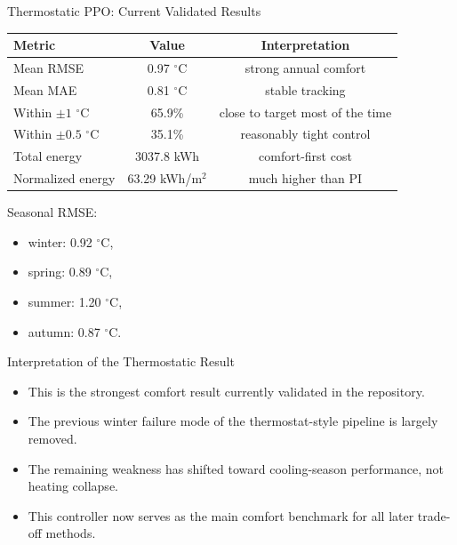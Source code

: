 \documentclass[aspectratio=169,11pt]{beamer}
\newcommand{\degc}{\ensuremath{^\circ\mathrm{C}}}
\begin{document}
\begin{frame}{Thermostatic PPO: Current Validated Results}
  \small
  \begin{tabular}{lcc}
    \toprule
    Metric & Value & Interpretation \\
    \midrule
    Mean RMSE & 0.97 \degc{} & strong annual comfort \\
    Mean MAE & 0.81 \degc{} & stable tracking \\
    Within $\pm 1$ \degc{} & 65.9\% & close to target most of the time \\
    Within $\pm 0.5$ \degc{} & 35.1\% & reasonably tight control \\
    Total energy & 3037.8 kWh & comfort-first cost \\
    Normalized energy & 63.29 kWh/m$^2$ & much higher than PI \\
    \bottomrule
  \end{tabular}

  \vspace{0.75em}
  Seasonal RMSE:
  \begin{itemize}
    \item winter: 0.92 \degc{},
    \item spring: 0.89 \degc{},
    \item summer: 1.20 \degc{},
    \item autumn: 0.87 \degc{}.
  \end{itemize}
\end{frame}

\begin{frame}{Interpretation of the Thermostatic Result}
  \begin{itemize}
    \item This is the strongest comfort result currently validated in the repository.
    \item The previous winter failure mode of the thermostat-style pipeline is largely removed.
    \item The remaining weakness has shifted toward cooling-season performance, not heating collapse.
    \item This controller now serves as the main comfort benchmark for all later trade-off methods.
  \end{itemize}
\end{frame}
\end{document}
